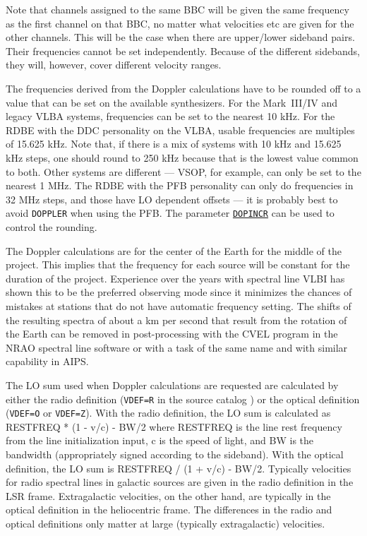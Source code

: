\documentclass{report}
\begin{document}
Note that channels assigned to the same BBC will be given the same
frequency as the first channel on that BBC, no matter what velocities
etc are given for the other channels.  This will be the case when
there are upper/lower sideband pairs.  Their frequencies cannot
be set independently.  Because of the different sidebands, they
will, however, cover different velocity ranges.

The frequencies derived from the Doppler calculations have to be
rounded off to a value that can be set on the available synthesizers.
For the Mark~III/IV and legacy VLBA systems, frequencies can be set to
the nearest 10 kHz.  For the RDBE with the DDC personality on the
VLBA, usable frequencies are multiples of 15.625 kHz.  Note that, if
there is a mix of systems with 10 kHz and 15.625 kHz steps, one should
round to 250 kHz because that is the lowest value common to both.
Other systems are different --- VSOP, for
example, can only be set to the nearest 1 MHz.  The RDBE with the
PFB personality can only do frequencies in 32 MHz steps, and those
have LO dependent offsets --- it is probably best to avoid {\tt DOPPLER}
when using the PFB.  The parameter
{\hyperref[MP:DOPINCR]{{\tt DOPINCR}}} can be used to control the rounding.

The Doppler calculations are for the center of the Earth for the
middle of the project. This implies that the frequency for each source
will be constant for the duration of the project. Experience over the
years with spectral line VLBI has shown this to be the preferred
observing mode since it minimizes the chances of mistakes at stations
that do not have automatic frequency setting. The shifts of the
resulting spectra of about a km per second that result from the
rotation of the Earth can be removed in post-processing with the {\sc
CVEL} program in the NRAO spectral line software or with a task of the
same name and with similar capability in {\sc AIPS}.

The LO sum used when Doppler calculations are requested are calculated
by either the radio definition ({\tt VDEF=R} in the source catalog )
or the optical definition ({\tt VDEF=O} or {\tt VDEF=Z}). With the
radio definition, the LO sum is calculated as RESTFREQ * (1 - v/c) -
BW/2 where RESTFREQ is the line rest frequency from the line
initialization input, c is the speed of light, and BW is the bandwidth
(appropriately signed according to the sideband).  With the optical
definition, the LO sum is RESTFREQ / (1 + v/c) - BW/2.  Typically
velocities for radio spectral lines in galactic sources are given in
the radio definition in the LSR frame.  Extragalactic velocities, on
the other hand, are typically in the optical definition in the
heliocentric frame.  The differences in the radio and optical
definitions only matter at large (typically extragalactic) velocities.
\end{document}
